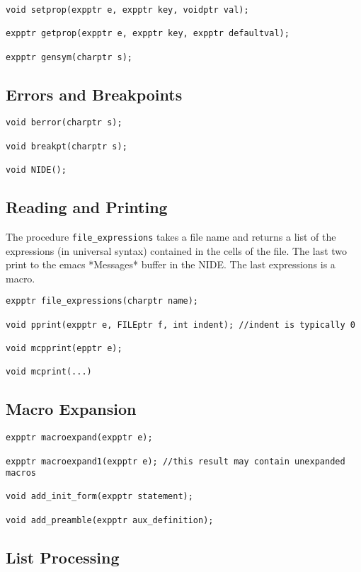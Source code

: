 \documentclass{article}
\begin{document}
\begin{verbatim}
void setprop(expptr e, expptr key, voidptr val);

expptr getprop(expptr e, expptr key, expptr defaultval);

expptr gensym(charptr s);
\end{verbatim}

\subsection{Errors and Breakpoints}

\begin{verbatim}
void berror(charptr s);

void breakpt(charptr s);

void NIDE();
\end{verbatim}

\subsection{Reading and Printing}
The procedure {\tt file\_expressions} takes a file name and returns a
list of the expressions (in universal syntax) contained in the cells
of the file.  The last two print to the emacs *Messages* buffer in
the NIDE.  The last expressions is a macro.

\begin{verbatim}
expptr file_expressions(charptr name);

void pprint(expptr e, FILEptr f, int indent); //indent is typically 0

void mcpprint(epptr e);

void mcprint(...)
\end{verbatim}

\subsection{Macro Expansion}

\begin{verbatim}
expptr macroexpand(expptr e);

expptr macroexpand1(expptr e); //this result may contain unexpanded macros

void add_init_form(expptr statement);

void add_preamble(expptr aux_definition);
\end{verbatim}

\subsection{List Processing}
\end{document}
